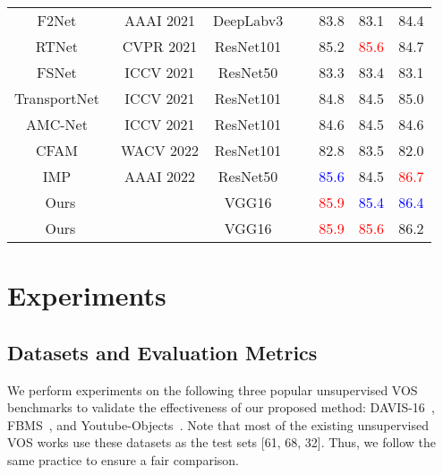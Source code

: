\documentclass[10pt,twocolumn,letterpaper]{article}
\begin{document}
\begin{table*}[t]
\begin{center}
\begin{tabular}{c|c|c|P{1.5cm}|ccc}
			F2Net~\cite{liu2021f2net}        & AAAI 2021             & DeepLabv3~\cite{chen2017rethinking}      &                       & 83.8                 & 83.1                 & 84.4                 \\
			RTNet~\cite{ren2021reciprocal}        & CVPR 2021             & ResNet101~\cite{he2016deep}      &                   & 85.2                 & \textcolor{red}{85.6}                 & 84.7                 \\
			FSNet~\cite{ji2021full}        & ICCV 2021             & ResNet50~\cite{he2016deep}       &                   & 83.3                 & 83.4                 & 83.1                 \\
			TransportNet~\cite{zhang2021deep} & ICCV 2021             & ResNet101~\cite{he2016deep}      &                       & 84.8                 & 84.5                 & 85.0                 \\
			AMC-Net~\cite{yang2021learning}      & ICCV 2021             & ResNet101~\cite{he2016deep}      &                   & 84.6                 & 84.5                 & 84.6                 \\
			CFAM~\cite{chen2022video}         & WACV 2022             & ResNet101~\cite{he2016deep}      &                       & 82.8                 & 83.5                 & 82.0                 \\
			IMP~\cite{lee2021iteratively}          & AAAI 2022             & ResNet50~\cite{he2016deep}       &                       & \textcolor{blue}{85.6}                 & 84.5                 & \textcolor{red}{86.7}                 \\ \hline
			Ours         &  & VGG16~\cite{simonyan2014very}          &  & \textcolor{red}{85.9} & \textcolor{blue}{85.4} & \textcolor{blue}{86.4} \\
			Ours         &                       & VGG16~\cite{simonyan2014very}          &                    &     \textcolor{red}{85.9}          &           \textcolor{red}{85.6}           &         86.2             \\ \hline
		\end{tabular}
	\end{center}
\end{table*}

\section{Experiments}
\subsection{Datasets and Evaluation Metrics}
We perform experiments on the following three popular unsupervised VOS benchmarks to validate the effectiveness of our proposed method: DAVIS-16~\cite{perazzi2016benchmark}, FBMS~\cite{ochs2013segmentation}, and Youtube-Objects~\cite{prest2012learning}. Note that most of the existing unsupervised VOS works use these datasets as the test sets [61, 68, 32]. Thus, we follow the same practice to ensure a fair comparison.
\end{document}
